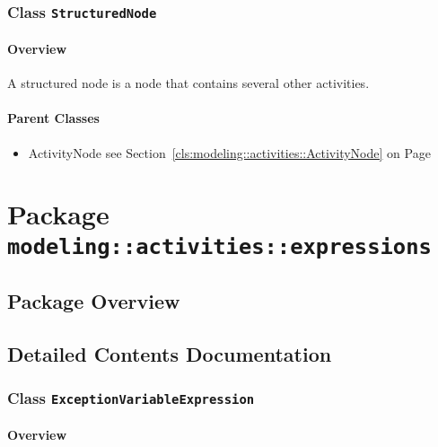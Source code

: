 \subsubsection{\Large{Class \bfseries \texttt{StructuredNode}\normalfont}}
\label{cls:modeling::activities::StructuredNode} 
\paragraph{Overview}

	
			
A structured node is a node that contains several other activities.	
		
	



\paragraph{Parent Classes}
\begin{itemize}
\item ActivityNode see Section~\ref{cls:modeling::activities::ActivityNode} on Page~\pageref{cls:modeling::activities::ActivityNode}\end{itemize}
\newpage
		


\section{Package \bfseries \texttt{modeling::activities::expressions}\normalfont}
\subsection{Package Overview}
	
			



\subsection{Detailed Contents Documentation}
\subsubsection{\Large{Class \bfseries \texttt{ExceptionVariableExpression}\normalfont}}
\label{cls:modeling::activities::expressions::ExceptionVariableExpression} 
\paragraph{Overview}


